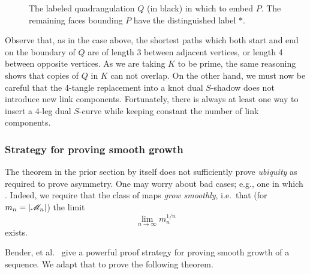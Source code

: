 \documentclass[amsmath,longbibliography,secnumarabic,floatfix,amssymb,nofootinbib,nobibnotes,letterpaper,11pt,notitlepage,tightenlines]{revtex4-1}
\begin{document}
\begin{enumerate}
\begin{enumerate}[i.]
\begin{figure}[h!]
      \caption{The labeled quadrangulation $Q$ (in black) in which to
        embed $P$. The remaining
        faces bounding $P$ have the distinguished label $*$.}
      \label{fig:knottangrep}
    \end{figure}
    Observe that, as in the case above, the shortest paths which both
    start and end on the boundary of $Q$ are of length 3 between
    adjacent vertices, or length 4 between opposite vertices. As we
    are taking $K$ to be prime, the same reasoning shows that copies
    of $Q$ in $K$ can not overlap. On the other hand, we must now be
    careful that the 4-tangle replacement into a knot dual $S$-shadow
    does not introduce new link components. Fortunately, there is
    always at least one way to insert a 4-leg dual $S$-curve while
    keeping constant the number of link components.
  \end{enumerate}
\end{enumerate}

\subsubsection{Strategy for proving smooth growth}
\label{sec:smoothstratproof}

The theorem in the prior section by itself does not sufficiently prove \emph{ubiquity} as required
to prove asymmetry. One may worry about bad cases; e.g., one in which . Indeed, we require that the
class of maps \emph{grow smoothly}, i.e.\ that (for $m_n = |\mathscr{M}_n|$) the limit
\[ \lim_{n\to\infty}{m_n^{1/n}} \] exists.

Bender, et al.\ \cite{Bender1992104} give a powerful proof strategy for proving smooth growth of a
sequence. We adapt that to prove the following theorem.
\end{document}
